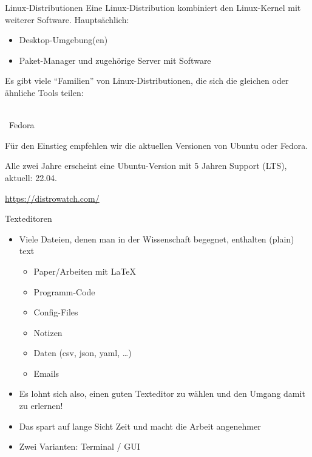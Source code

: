 \begin{frame}{Linux-Distributionen}
  Eine Linux-Distribution kombiniert den Linux-Kernel mit weiterer Software. Hauptsächlich:
  \begin{itemize}
    \item Desktop-Umgebung(en)
    \item Paket-Manager und zugehörige Server mit Software
  \end{itemize}

  Es gibt viele \enquote{Familien} von Linux-Distributionen, die sich die gleichen oder ähnliche Tools teilen:
  \begin{center}
    \hspace{0.5cm} \\[1\baselineskip]

    ~{\Huge Fedora}
    \hspace{0.5cm}
  \end{center}

  Für den Einstieg empfehlen wir die aktuellen Versionen von Ubuntu oder Fedora.

  Alle zwei Jahre erscheint eine Ubuntu-Version mit 5 Jahren Support (LTS), aktuell: 22.04.

  \url{https://distrowatch.com/} 
\end{frame}



\begin{frame}{Texteditoren}
  \begin{itemize}
    \item Viele Dateien, denen man in der Wissenschaft begegnet, enthalten (plain) text
      \begin{itemize}
        \item Paper/Arbeiten mit \LaTeX
        \item Programm-Code
        \item Config-Files
        \item Notizen
        \item Daten (csv, json, yaml, …)
        \item Emails
      \end{itemize}
    \item Es lohnt sich also, einen guten Texteditor zu wählen und den Umgang damit zu erlernen!
    \item Das spart auf lange Sicht Zeit und macht die Arbeit angenehmer
    \item Zwei Varianten: Terminal / GUI
  \end{itemize}
\end{frame}

